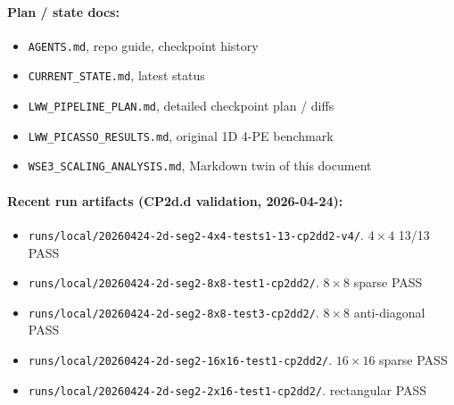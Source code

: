 \documentclass[11pt]{article}
\newcommand{\file}[1]{\texttt{#1}}
\begin{document}
\paragraph{Plan / state docs:}
\begin{itemize}[leftmargin=1.3em,itemsep=0.15em]
  \item \file{AGENTS.md}, repo guide, checkpoint history
  \item \file{CURRENT\_STATE.md}, latest status
  \item \file{LWW\_PIPELINE\_PLAN.md}, detailed checkpoint plan / diffs
  \item \file{LWW\_PICASSO\_RESULTS.md}, original 1D 4-PE benchmark
  \item \file{WSE3\_SCALING\_ANALYSIS.md}, Markdown twin of this document
\end{itemize}

\paragraph{Recent run artifacts (CP2d.d validation, 2026-04-24):}
\begin{itemize}[leftmargin=1.3em,itemsep=0.15em]
  \item \file{runs/local/20260424-2d-seg2-4x4-tests1-13-cp2dd2-v4/}.
    $4\times 4$ 13/13 PASS
  \item \file{runs/local/20260424-2d-seg2-8x8-test1-cp2dd2/}.
    $8\times 8$ sparse PASS
  \item \file{runs/local/20260424-2d-seg2-8x8-test3-cp2dd2/}.
    $8\times 8$ anti-diagonal PASS
  \item \file{runs/local/20260424-2d-seg2-16x16-test1-cp2dd2/}.
    $16\times 16$ sparse PASS
  \item \file{runs/local/20260424-2d-seg2-2x16-test1-cp2dd2/}.
    rectangular PASS
\end{itemize}
\end{document}
